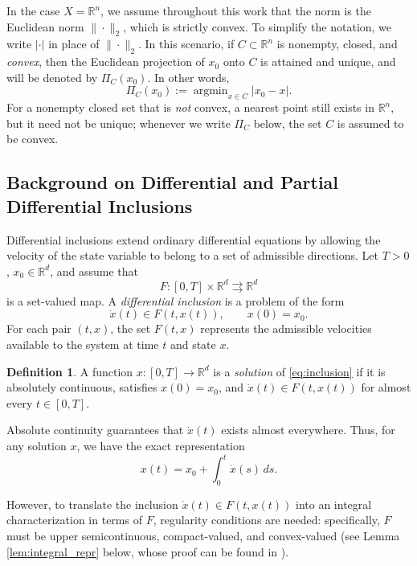 \documentclass[11pt]{elsarticle}
\theoremstyle{definition}
\newtheorem{definition}[theorem]{Definition}
\theoremstyle{remark}
\numberwithin{equation}{section}
\DeclareMathOperator{\argmin}{argmin}
\begin{document}
	In the case $X=\mathbb{R}^n$, we assume throughout this work that the norm is the Euclidean norm $\|\cdot\|_2$, which is strictly convex. To simplify the notation, we write $|\cdot|$ in place of $\|\cdot\|_2$. In this scenario, if $C\subset\mathbb{R}^n$ is nonempty, closed, and \emph{convex}, then the Euclidean projection of $x_0$ onto $C$ is attained and unique, and will be denoted by $\Pi_C(x_0)$. In other words,
	\begin{equation}
		\Pi_{C}(x_0):=\argmin_{x\in C}|x_0-x|.
	\end{equation}
For a nonempty closed set that is \emph{not} convex, a nearest point still exists in $\mathbb{R}^n$, but it need not be unique; whenever we write $\Pi_C$ below, the set $C$ is assumed to be convex.
	
	
	\subsection{Background on Differential and Partial Differential Inclusions} \label{sec:basics}
	
	Differential inclusions extend ordinary differential equations by
	allowing the velocity of the state variable to belong to a set of
	admissible directions.  Let $T>0$, $x_0\in\mathbb{R}^d$, and assume that
	\[
	F:[0,T]\times\mathbb{R}^d\rightrightarrows\mathbb{R}^d
	\]
	is a set-valued map.  A \emph{differential inclusion} is a problem of
	the form
	\begin{equation}\label{eq:inclusion}
		\dot{x}(t)\in F(t,x(t)),\qquad x(0)=x_0.
	\end{equation}
	For each pair $(t,x)$, the set $F(t,x)$ represents the admissible
	velocities available to the system at time $t$ and state $x$.
	
	\begin{definition}
		A function $x:[0,T]\to\mathbb{R}^d$ is a \emph{solution} of
		\eqref{eq:inclusion} if it is absolutely continuous, satisfies
		$x(0)=x_0$, and $\dot{x}(t)\in F(t,x(t))$ for almost every $t\in[0,T]$.
	\end{definition}
	
	Absolute continuity guarantees that $\dot{x}(t)$ 
	exists almost everywhere. Thus, for any solution $x$, we have 
	the exact representation
	\[
	x(t) = x_0 + \int_{0}^{t} \dot{x}(s) \, ds.
	\]
	
	
	However, to translate the inclusion $\dot{x}(t) \in F(t,x(t))$ into 
	an integral characterization in terms of $F$, regularity conditions 
	are needed: specifically, $F$ must be upper semicontinuous, compact-valued,
	and convex-valued (see Lemma \ref{lem:integral_repr} below, whose proof can be
	found in \cite[Lemma~1, p.\,99]{aubin_cellina_1984}).
	
\end{document}
